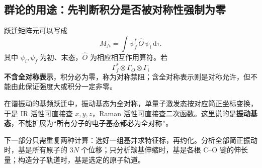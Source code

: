 \subsection{群论的用途：先判断积分是否被对称性强制为零}
跃迁矩阵元可以写成
\[
 M_{fi}=\int\psi_f^*\,\hat O\,\psi_i\,\mathrm d\tau.
\]
其中 $\psi_i,\psi_f$ 为初、末态，$\hat O$ 为相应相互作用算符。若
\[
 \Gamma_f^*\otimes\Gamma_O\otimes\Gamma_i
\]
\textbf{不含全对称表示}，积分必为零，称为对称禁阻；含全对称表示则是对称允许，但不能由此保证强度大或积分一定非零。

在谐振动的基频跃迁中，振动基态为全对称，单量子激发态按对应简正坐标变换，于是 IR 活性可直接查 $x,y,z$，Raman 活性可直接查二次函数。这里说的是\textbf{振动基态}，不能扩展为“所有分子的电子基态都必为全对称”。

\begin{keyidea}[从数学接回化学]
下一部分只需重复两种计算：选好一组基并求特征标，再约化。分析全部简正振动时，基是所有原子的 $3N$ 个位移；只分析羰基伸缩时，基是各根 C--O 键的伸长量；构造分子轨道时，基是选定的原子轨道。
\end{keyidea}
